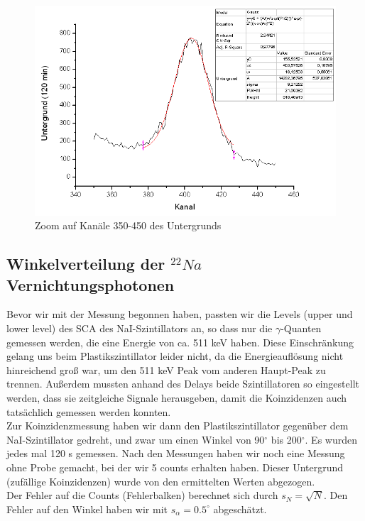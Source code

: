 \begin{figure}[H]
\centering \includegraphics[width = \textwidth]{auswertung/UG2.png}
\caption{Zoom auf Kanäle 350-450 des Untergrunds}
\end{figure}

\subsection{Winkelverteilung der $^{22}Na$ Vernichtungsphotonen}

Bevor wir mit der Messung begonnen haben, passten wir die Levels (upper und lower level) des SCA des NaI-Szintillators an, so dass nur die $\gamma$-Quanten gemessen werden, die eine Energie von ca. 511 keV haben. Diese Einschränkung gelang uns beim Plastikszintillator leider nicht, da die Energieauflösung nicht hinreichend groß war, um den 511 keV Peak vom anderen Haupt-Peak zu trennen. Außerdem mussten anhand des Delays beide Szintillatoren so eingestellt werden, dass sie zeitgleiche Signale herausgeben, damit die Koinzidenzen auch tatsächlich gemessen werden konnten.\\

Zur Koinzidenzmessung haben wir dann den Plastikszintillator gegenüber dem NaI-Szintillator gedreht, und zwar um einen Winkel von 90$^\circ$ bis 200$^\circ$. Es wurden jedes mal 120 s gemessen. Nach den Messungen haben wir noch eine Messung ohne Probe gemacht, bei der wir 5 counts erhalten haben. Dieser Untergrund (zufällige Koinzidenzen) wurde von den ermittelten Werten abgezogen.\\

Der Fehler auf die Counts (Fehlerbalken) berechnet sich durch $s_N = \sqrt{N}$. Den Fehler auf den Winkel haben wir mit $s_\alpha = 0.5^\circ$ abgeschätzt.

